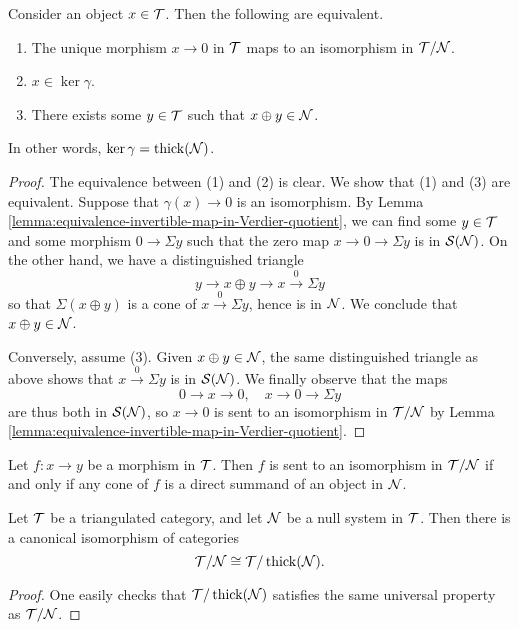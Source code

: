 \begin{proposition}
	Consider an object \(x\in\mathcal{T}\). Then the following are equivalent.
	\begin{enumerate}[label=(\arabic*)]
	\item The unique morphism \(x\to 0\) in \(\mathcal{T}\) maps to an isomorphism in \(\mathcal{T}/\mathcal{N}\).
	\item \(x\in\ker\gamma\).
	\item There exists some \(y\in\mathcal{T}\) such that \(x\oplus y\in\mathcal{N}\).
	\end{enumerate}
	In other words, \(\ker\gamma = \operatorname{thick}(\mathcal{N})\).
\end{proposition}
\begin{proof}
The equivalence between (1) and (2) is clear. We show that (1) and (3) are equivalent. Suppose that \(\gamma(x)\to0\) is an isomorphism. By Lemma \ref{lemma:equivalence-invertible-map-in-Verdier-quotient},
we can find some \(y\in\mathcal{T}\) and some morphism \(0\to \Sigma y\) such that the zero map \(x\to0\to\Sigma y\) is in \(\mathcal{S}(\mathcal{N})\). On the other hand, we have a distinguished triangle
\[ y \to x\oplus y\to x \overset{0}\to \Sigma y \]
so that \(\Sigma(x\oplus y)\) is a cone of \(x\overset{0}\to \Sigma y\), hence is in \(\mathcal{N}\). We conclude that \(x\oplus y\in\mathcal{N}\).

Conversely, assume (3). Given \(x\oplus y\in\mathcal{N}\), the same distinguished triangle as above shows that \(x\overset{0}\to\Sigma y\) is in \(\mathcal{S}(\mathcal{N})\). We finally observe that the maps
\[ 0 \to x\to 0,\quad x\to 0\to\Sigma y \]
are thus both in \(\mathcal{S}(\mathcal{N})\), so \(x\to 0\) is sent to an isomorphism in \(\mathcal{T}/\mathcal{N}\) by Lemma \ref{lemma:equivalence-invertible-map-in-Verdier-quotient}.
\end{proof}

\begin{corollary}
	Let \(f\!:x\to y\) be a morphism in \(\mathcal{T}\). Then \(f\) is sent to an isomorphism in \(\mathcal{T}/\mathcal{N}\) if and only if any cone of \(f\) is a direct summand of an object in \(\mathcal{N}\).
\end{corollary}
\begin{corollary}
	Let \(\mathcal{T}\) be a triangulated category, and let \(\mathcal{N}\) be a null system in \(\mathcal{T}\). Then there is a canonical isomorphism of categories
	\[ \mathcal{T}/\mathcal{N} \cong \mathcal{T}/\operatorname{thick}(\mathcal{N}). \]
\end{corollary}
\begin{proof}
One easily checks that \(\mathcal{T}/\operatorname{thick}(\mathcal{N})\) satisfies the same universal property as \(\mathcal{T}/\mathcal{N}\).
\end{proof}

